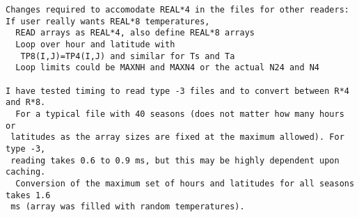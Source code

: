 \begin{verbatim}
Changes required to accomodate REAL*4 in the files for other readers:
If user really wants REAL*8 temperatures, 
  READ arrays as REAL*4, also define REAL*8 arrays 
  Loop over hour and latitude with 
   TP8(I,J)=TP4(I,J) and similar for Ts and Ta
  Loop limits could be MAXNH and MAXN4 or the actual N24 and N4

I have tested timing to read type -3 files and to convert between R*4 and R*8.
  For a typical file with 40 seasons (does not matter how many hours or
 latitudes as the array sizes are fixed at the maximum allowed). For type -3,
 reading takes 0.6 to 0.9 ms, but this may be highly dependent upon caching.
  Conversion of the maximum set of hours and latitudes for all seasons takes 1.6
 ms (array was filled with random temperatures).

\end{verbatim} 
